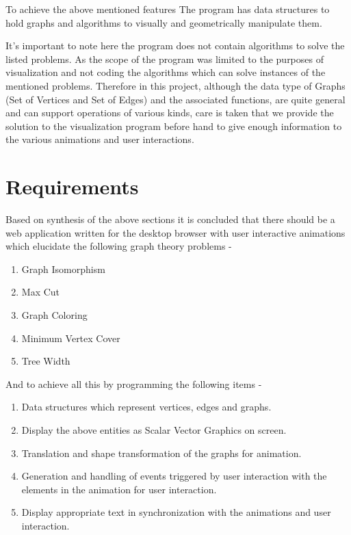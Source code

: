 To achieve the above mentioned features
The program has data structures to hold graphs and
algorithms to visually and geometrically manipulate them. 

It's important to note here the program does not 
contain algorithms to solve the listed problems. As the
scope of the program was limited to the purposes of visualization and not
coding the algorithms which can solve instances of the mentioned problems.
Therefore in this project, although the data type of Graphs (Set of
Vertices and Set of Edges) and the associated functions, are quite general and
can support operations of various kinds, care is taken that we provide the
solution to the visualization program before hand to give enough information to
the various animations and user interactions.


\section{Requirements}
Based on synthesis of the above sections it is concluded that
there should be a web application written for the desktop browser with user interactive animations which elucidate the following
graph theory problems -

\begin{enumerate}
\item Graph Isomorphism
\item Max Cut
\item Graph Coloring
\item Minimum Vertex Cover
\item Tree Width
\end{enumerate}

And to achieve all this by programming the following items -

\begin{enumerate}
\item Data structures which represent vertices, edges and graphs.
\item Display the above entities as Scalar Vector Graphics on screen.
\item Translation and shape transformation of the graphs for animation.
\item Generation and handling of events triggered by user interaction with the elements in the animation for user interaction.
\item Display appropriate text in synchronization with the animations and user interaction.
\end{enumerate}

